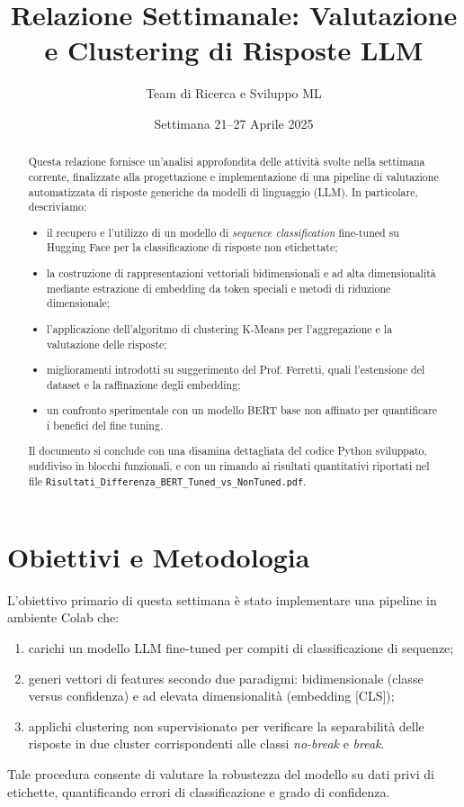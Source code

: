 \documentclass[a4paper,11pt]{article}
\title{\textbf{Relazione Settimanale: Valutazione e Clustering di Risposte LLM}}%
\author{Team di Ricerca e Sviluppo ML}
\date{Settimana 21--27 Aprile 2025}
\begin{document}
\maketitle

\begin{abstract}
Questa relazione fornisce un'analisi approfondita delle attività svolte nella settimana corrente, finalizzate alla progettazione e implementazione di una pipeline di valutazione automatizzata di risposte generiche da modelli di linguaggio (LLM). In particolare, descriviamo:
\begin{itemize}
  \item il recupero e l'utilizzo di un modello di \emph{sequence classification} fine-tuned su Hugging Face per la classificazione di risposte non etichettate;
  \item la costruzione di rappresentazioni vettoriali bidimensionali e ad alta dimensionalità mediante estrazione di embedding da token speciali e metodi di riduzione dimensionale;
  \item l'applicazione dell'algoritmo di clustering K-Means per l'aggregazione e la valutazione delle risposte;
  \item miglioramenti introdotti su suggerimento del Prof. Ferretti, quali l'estensione del dataset e la raffinazione degli embedding;
  \item un confronto sperimentale con un modello BERT base non affinato per quantificare i benefici del fine tuning.
\end{itemize}
Il documento si conclude con una disamina dettagliata del codice Python sviluppato, suddiviso in blocchi funzionali, e con un rimando ai risultati quantitativi riportati nel file \texttt{Risultati\_Differenza\_BERT\_Tuned\_vs\_NonTuned.pdf}.
\end{abstract}

\section{Obiettivi e Metodologia}
L'obiettivo primario di questa settimana è stato implementare una pipeline in ambiente Colab che:
\begin{enumerate}
  \item carichi un modello LLM fine-tuned per compiti di classificazione di sequenze;
  \item generi vettori di features secondo due paradigmi: bidimensionale (classe versus confidenza) e ad elevata dimensionalità (embedding [CLS]);
  \item applichi clustering non supervisionato per verificare la separabilità delle risposte in due cluster corrispondenti alle classi \emph{no-break} e \emph{break}.
\end{enumerate}
Tale procedura consente di valutare la robustezza del modello su dati privi di etichette, quantificando errori di classificazione e grado di confidenza.
\end{document}
